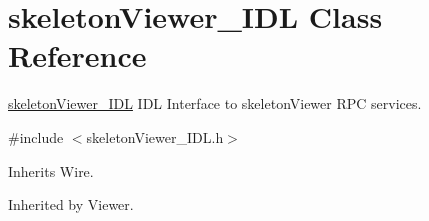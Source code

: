 \section{skeleton\+Viewer\+\_\+\+I\+DL Class Reference}
\label{classskeletonViewer__IDL}


\hyperlink{classskeletonViewer__IDL}{skeleton\+Viewer\+\_\+\+I\+DL} I\+DL Interface to skeleton\+Viewer R\+PC services.  




{\ttfamily \#include $<$skeleton\+Viewer\+\_\+\+I\+D\+L.\+h$>$}



Inherits Wire.



Inherited by Viewer.

